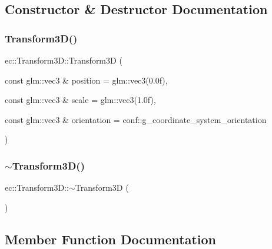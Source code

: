 \subsection{Constructor \& Destructor Documentation}
\mbox{\label{classec_1_1_transform3_d_aec13468ee4386a737b62c780086e9f95}} 
\subsubsection{\texorpdfstring{Transform3\+D()}{Transform3D()}}
{\footnotesize\ttfamily ec\+::\+Transform3\+D\+::\+Transform3D (\begin{DoxyParamCaption}\item[{const glm\+::vec3 \&}]{position = {\ttfamily glm\+:\+:vec3(0.0f)},  }\item[{const glm\+::vec3 \&}]{scale = {\ttfamily glm\+:\+:vec3(1.0f)},  }\item[{const glm\+::vec3 \&}]{orientation = {\ttfamily conf\+:\+:g\+\_\+coordinate\+\_\+system\+\_\+orientation} }\end{DoxyParamCaption})\hspace{0.3cm}{\ttfamily [explicit]}}

\mbox{\label{classec_1_1_transform3_d_a1df4b7afcf78aef64719b2302cfac864}} 
\subsubsection{\texorpdfstring{$\sim$\+Transform3\+D()}{~Transform3D()}}
{\footnotesize\ttfamily ec\+::\+Transform3\+D\+::$\sim$\+Transform3D (\begin{DoxyParamCaption}{ }\end{DoxyParamCaption})}



\subsection{Member Function Documentation}
\mbox{\label{classec_1_1_transform3_d_a39bf61001742803f82e888e2b64a58f4}} 
